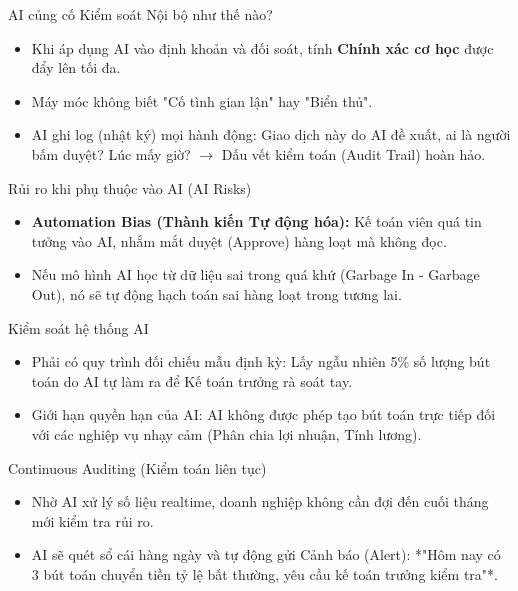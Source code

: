 \documentclass[aspectratio=169]{beamer}
\begin{document}
\begin{frame}{AI củng cố Kiểm soát Nội bộ như thế nào?}
    \begin{itemize}
        \item Khi áp dụng AI vào định khoản và đối soát, tính \textbf{Chính xác cơ học} được đẩy lên tối đa.
        \item Máy móc không biết "Cố tình gian lận" hay "Biển thủ".
        \item AI ghi log (nhật ký) mọi hành động: Giao dịch này do AI đề xuất, ai là người bấm duyệt? Lúc mấy giờ? $\rightarrow$ Dấu vết kiểm toán (Audit Trail) hoàn hảo.
    \end{itemize}
\end{frame}


\begin{frame}{Rủi ro khi phụ thuộc vào AI (AI Risks)}
    \begin{itemize}
        \item \textbf{Automation Bias (Thành kiến Tự động hóa):} Kế toán viên quá tin tưởng vào AI, nhắm mắt duyệt (Approve) hàng loạt mà không đọc.
        \item Nếu mô hình AI học từ dữ liệu sai trong quá khứ (Garbage In - Garbage Out), nó sẽ tự động hạch toán sai hàng loạt trong tương lai.
    \end{itemize}
\end{frame}


\begin{frame}{Kiểm soát hệ thống AI}
    \begin{itemize}
        \item Phải có quy trình đối chiếu mẫu định kỳ: Lấy ngẫu nhiên 5\% số lượng bút toán do AI tự làm ra để Kế toán trưởng rà soát tay.
        \item Giới hạn quyền hạn của AI: AI không được phép tạo bút toán trực tiếp đối với các nghiệp vụ nhạy cảm (Phân chia lợi nhuận, Tính lương).
    \end{itemize}
\end{frame}


\begin{frame}{Continuous Auditing (Kiểm toán liên tục)}
    \begin{itemize}
        \item Nhờ AI xử lý số liệu realtime, doanh nghiệp không cần đợi đến cuối tháng mới kiểm tra rủi ro.
        \item AI sẽ quét sổ cái hàng ngày và tự động gửi Cảnh báo (Alert): *"Hôm nay có 3 bút toán chuyển tiền tỷ lệ bất thường, yêu cầu kế toán trưởng kiểm tra"*.
    \end{itemize}
\end{frame}
\end{document}
